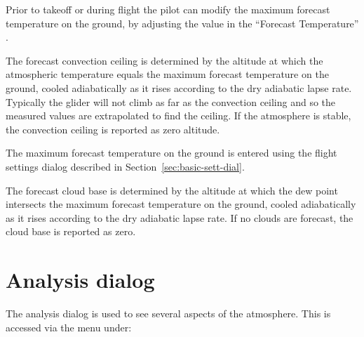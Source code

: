 \documentclass[a4paper,12pt]{refrep}
\begin{document}
Prior to takeoff or during flight the pilot can modify the maximum
forecast temperature on the ground, by adjusting the value in the
``Forecast Temperature'' {\InfoBox}.

The forecast convection ceiling is determined by the altitude at which
the atmospheric temperature equals the maximum forecast temperature on
the ground, cooled adiabatically as it rises according to the dry
adiabatic lapse rate.  Typically the glider will not climb as far as
the convection ceiling and so the measured values are extrapolated to
find the ceiling.  If the atmosphere is stable, the convection ceiling
is reported as zero altitude.

The maximum forecast temperature on the ground is entered using the
flight settings dialog described in Section~\ref{sec:basic-sett-dial}.


%

The forecast cloud base is determined by the altitude at which the dew
point intersects the maximum forecast temperature on the ground,
cooled adiabatically as it rises according to the dry adiabatic lapse
rate.  If no clouds are forecast, the cloud base is reported as zero.


\section{Analysis dialog}

The analysis dialog is used to see several aspects of the atmosphere.
This is accessed via the menu under:
\begin{quote}
\blink{}
\end{quote}
\end{document}
